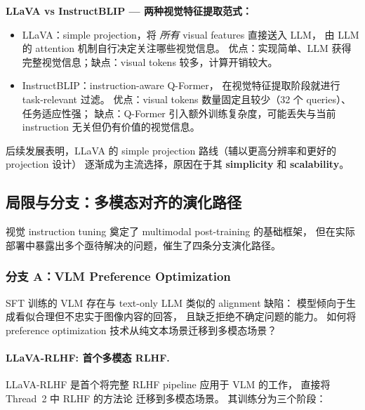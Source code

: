 \begin{solutionbox}
\textbf{LLaVA vs InstructBLIP --- 两种视觉特征提取范式：}
\begin{itemize}[leftmargin=2em]
  \item LLaVA：simple projection，将 \textit{所有} visual features 直接送入 LLM，
    由 LLM 的 attention 机制自行决定关注哪些视觉信息。
    优点：实现简单、LLM 获得完整视觉信息；缺点：visual tokens 较多，计算开销较大。
  \item InstructBLIP：instruction-aware Q-Former，
    在视觉特征提取阶段就进行 task-relevant 过滤。
    优点：visual tokens 数量固定且较少（32 个 queries）、任务适应性强；
    缺点：Q-Former 引入额外训练复杂度，可能丢失与当前 instruction 无关但仍有价值的视觉信息。
\end{itemize}
后续发展表明，LLaVA 的 simple projection 路线（辅以更高分辨率和更好的 projection 设计）
逐渐成为主流选择，原因在于其 \textbf{simplicity} 和 \textbf{scalability}。
\end{solutionbox}

\subsection{局限与分支：多模态对齐的演化路径}
\label{sec:t5-branches}

视觉 instruction tuning 奠定了 multimodal post-training 的基础框架，
但在实际部署中暴露出多个亟待解决的问题，催生了四条分支演化路径。

\subsubsection{分支 A：VLM Preference Optimization}
\label{sec:t5-branch-a}

\begin{problembox}
SFT 训练的 VLM 存在与 text-only LLM 类似的 alignment 缺陷：
模型倾向于生成看似合理但不忠实于图像内容的回答，
且缺乏拒绝不确定问题的能力。
如何将 preference optimization 技术从纯文本场景迁移到多模态场景？
\end{problembox}

\paragraph{LLaVA-RLHF: 首个多模态 RLHF.}
LLaVA-RLHF \cite{sun2023llava-rlhf} 是首个将完整 RLHF pipeline 应用于 VLM 的工作，
直接将 Thread~2 中 RLHF 的方法论
迁移到多模态场景。
其训练分为三个阶段：

